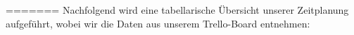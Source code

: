 % 
% 
% 
=======
Nachfolgend wird eine tabellarische Übersicht unserer Zeitplanung aufgeführt, wobei wir die Daten aus unserem Trello-Board entnehmen:\\

